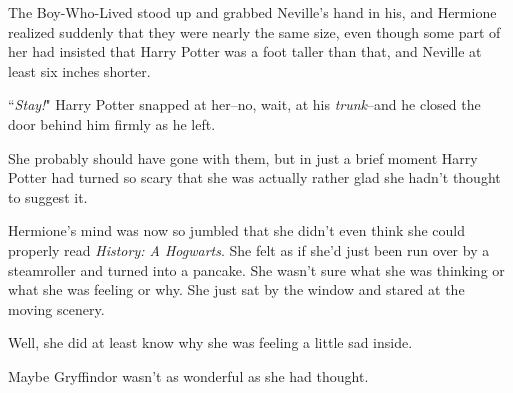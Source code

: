 The Boy-Who-Lived stood up and grabbed Neville's hand in his, and Hermione realized suddenly that they were nearly the same size, even though some part of her had insisted that Harry Potter was a foot taller than that, and Neville at least six inches shorter.

``\emph{Stay!}" Harry Potter snapped at her\---no, wait, at his \emph{trunk}\---and he closed the door behind him firmly as he left.

She probably should have gone with them, but in just a brief moment Harry Potter had turned so scary that she was actually rather glad she hadn't thought to suggest it.

Hermione's mind was now so jumbled that she didn't even think she could properly read \emph{History: A Hogwarts}. She felt as if she'd just been run over by a steamroller and turned into a pancake. She wasn't sure what she was thinking or what she was feeling or why. She just sat by the window and stared at the moving scenery.

Well, she did at least know why she was feeling a little sad inside.

Maybe Gryffindor wasn't as wonderful as she had thought.

